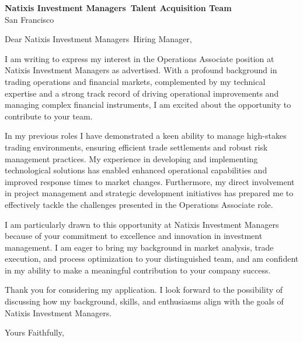\documentclass{letter}
\newcommand{\company}{Natixis Investment Managers}
\begin{document}
\begin{letter}{\textbf{\company\ Talent Acquisition Team} \\                
    San Francisco }

\opening{Dear \company\ Hiring Manager,}

I am writing to express my interest in the Operations Associate position at Natixis Investment Managers as advertised. With a profound background in trading operations and financial markets, complemented by my technical expertise and a strong track record of driving operational improvements and managing complex financial instruments, I am excited about the opportunity to contribute to your team.

In my previous roles I have demonstrated a keen ability to manage high-stakes trading environments, ensuring efficient trade settlements and robust risk management practices. My experience in developing and implementing technological solutions has enabled enhanced operational capabilities and improved response times to market changes. Furthermore, my direct involvement in project management and strategic development initiatives has prepared me to effectively tackle the challenges presented in the Operations Associate role.

I am particularly drawn to this opportunity at Natixis Investment Managers because of your commitment to excellence and innovation in investment management. I am eager to bring my background in market analysis, trade execution, and process optimization to your distinguished team, and am confident in my ability to make a meaningful contribution to your company success.

Thank you for considering my application. I look forward to the possibility of discussing how my background, skills, and enthusiasms align with the goals of Natixis Investment Managers.



\closing{Yours Faithfully,}

\end{letter}
\end{document}
